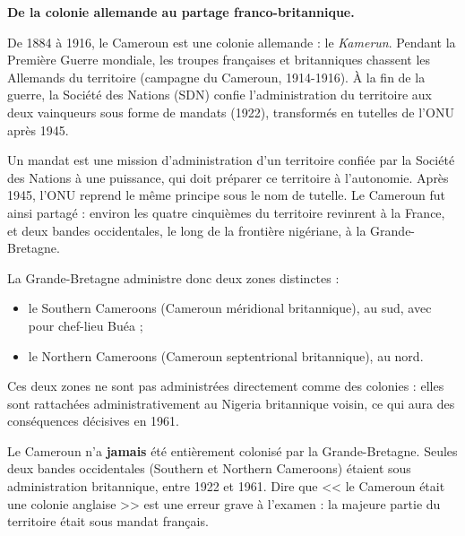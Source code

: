 \documentclass[11pt]{article}
\newcommand{\cle}[1]{{\popxbold\color{popdark}#1}}
\begin{document}
\textbf{De la colonie allemande au partage franco-britannique.}

De 1884 à 1916, le Cameroun est une colonie allemande : le \emph{Kamerun}. Pendant la Première Guerre mondiale, les troupes françaises et britanniques chassent les Allemands du territoire (campagne du Cameroun, 1914-1916). À la fin de la guerre, la Société des Nations (SDN) confie l'administration du territoire aux deux vainqueurs sous forme de \cle{mandats} (1922), transformés en \cle{tutelles} de l'ONU après 1945.

\begin{definition}
Un \cle{mandat} est une mission d'administration d'un territoire confiée par la Société des Nations à une puissance, qui doit préparer ce territoire à l'autonomie. Après 1945, l'ONU reprend le même principe sous le nom de \cle{tutelle}. Le Cameroun fut ainsi partagé : environ les quatre cinquièmes du territoire revinrent à la France, et deux bandes occidentales, le long de la frontière nigériane, à la Grande-Bretagne.
\end{definition}

La Grande-Bretagne administre donc deux zones distinctes :
\begin{itemize}
\item le \cle{Southern Cameroons} (Cameroun méridional britannique), au sud, avec pour chef-lieu Buéa ;
\item le \cle{Northern Cameroons} (Cameroun septentrional britannique), au nord.
\end{itemize}
Ces deux zones ne sont pas administrées directement comme des colonies : elles sont rattachées administrativement au \cle{Nigeria} britannique voisin, ce qui aura des conséquences décisives en 1961.

\begin{attention}
Le Cameroun n'a \textbf{jamais} été entièrement colonisé par la Grande-Bretagne. Seules deux bandes occidentales (Southern et Northern Cameroons) étaient sous administration britannique, entre 1922 et 1961. Dire que << le Cameroun était une colonie anglaise >> est une erreur grave à l'examen : la majeure partie du territoire était sous mandat français.
\end{attention}
\end{document}
